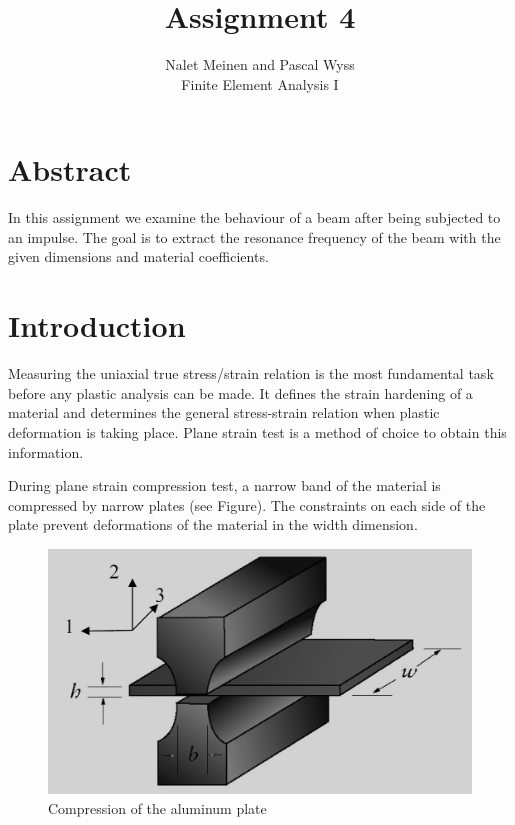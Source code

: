 \documentclass[12pt]{article}
\begin{document}


\title{Assignment 4}%
\author{Nalet Meinen and Pascal Wyss\\ %
Finite Element Analysis I
}
\maketitle
\section*{Abstract}
In this assignment we examine the behaviour of a beam after being subjected to an impulse.
The goal is to extract the resonance frequency of the beam with the given dimensions and material coefficients.



\tableofcontents
\pagebreak
\section{Introduction}
Measuring the uniaxial true stress/strain relation is the most fundamental task before any plastic
analysis can be made. It defines the strain hardening of a material and determines the general
stress-strain relation when plastic deformation is taking place. Plane strain test is a method of
choice to obtain this information.

During plane strain compression test, a narrow band of the material is compressed by narrow
plates (see Figure). The constraints on each side of the plate prevent deformations of the
material in the width dimension.

\begin{figure}[!htb]
  \centering
  \includegraphics[width=0.6\linewidth]{pics/shematics}
  \caption{Compression of the aluminum plate}
  \label{fig:1}
\end{figure}
\newpage
\end{document}
